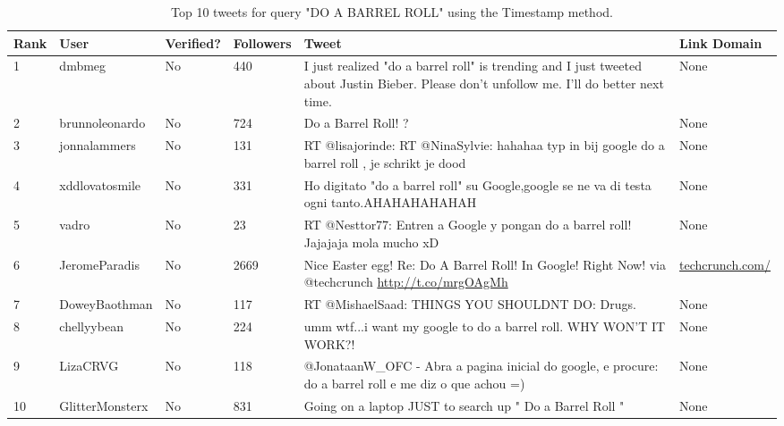 \documentclass[10pt]{proc}
\begin{document}
    \begin{table*}[t]
      \begin{tabular}{| l | l | l | l | p{6.5cm} | p{2cm} |}
        \hline
        Rank & User & Verified? & Followers & Tweet & Link Domain \\
        \hline
        1 & dmbmeg & No & 440 & I just realized "do a barrel roll" is trending and I just tweeted about Justin Bieber. Please don't unfollow me. I'll do better next time. & None \\
        \hline
        2 & brunnoleonardo & No & 724 & Do a Barrel Roll! ? & None \\
        \hline
        3 & jonnalammers & No & 131 & RT @lisajorinde: RT @NinaSylvie: hahahaa typ in bij google do a barrel roll , je schrikt je dood & None \\
        \hline
        4 & xddlovatosmile & No & 331 & Ho digitato "do a barrel roll" su Google,google se ne va di testa ogni tanto.AHAHAHAHAHAH & None \\
        \hline
        5 & vadro & No & 23 & RT @Nesttor77: Entren a Google y pongan do a barrel roll! Jajajaja mola mucho xD & None \\
        \hline
        6 & JeromeParadis & No & 2669 & Nice Easter egg! Re: Do A Barrel Roll! In Google! Right Now! via @techcrunch \url{http://t.co/mrgOAgMh} & \url{techcrunch.com/} \\
        \hline
        7 & DoweyBaothman & No & 117 & RT @MishaelSaad: THINGS YOU SHOULDNT DO: Drugs. & None \\
        \hline
        8 & chellyybean & No & 224 & umm wtf...i want my google to do a barrel roll. WHY WON'T IT WORK?! & None \\
        \hline
        9 & LizaCRVG & No & 118 & @JonataanW\_OFC - Abra a pagina inicial do google, e procure: do a barrel roll e me diz o que achou =) & None \\
        \hline
        10 & GlitterMonsterx & No & 831 & Going on a laptop JUST to search up " Do a Barrel Roll " & None \\
        \hline
      \end{tabular}
      \caption{Top 10 tweets for query "DO A BARREL ROLL" using the Timestamp method.}
      \label{BarrelRollTimestamp}      
    \end{table*}
    
\end{document}
